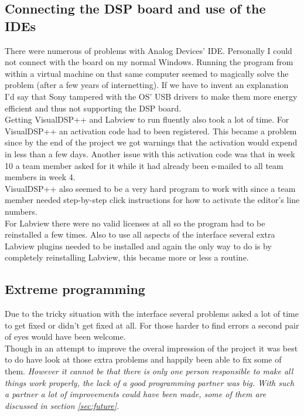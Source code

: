\subsection{Connecting the DSP board and use of the IDEs}
There were numerous of problems with Analog Devices' IDE. Personally I could not connect with the board on my normal Windows. Running the program from within a virtual machine on that same computer seemed to magically solve the problem (after a few years of internetting). If we have to invent an explanation I'd say that Sony tampered with the OS' USB drivers to make them more energy efficient and thus not supporting the DSP board.\\
Getting VisualDSP++ and Labview to run fluently also took a lot of time. For VisualDSP++ an activation code had to been registered. This became a problem since by the end of the project we got warnings that the activation would expend in less than a few days. Another issue with this activation code was that in week 10 a team member asked for it while it had already been e-mailed to all team members in week 4.\\
VisualDSP++ also seemed to be a very hard program to work with since a team member needed step-by-step click instructions for how to activate the editor's line numbers. \\
For Labview there were no valid licenses at all so the program had to be reinstalled a few times. Also to use all aspects of the interface several extra Labview plugins needed to be installed and again the only way to do is by completely reinstalling Labview, this became more or less a routine.
\subsection{Extreme programming}
Due to the tricky situation with the interface several problems asked a lot of time to get fixed or didn't get fixed at all. For those harder to find errors a second pair of eyes would have been welcome.\\
Though in an attempt to improve the overal impression of the project it was best to do have look at those extra problems and happily been able to fix some of them. \emph{However it cannot be that there is only one person responsible to make all things work properly, the lack of a good programming partner was big. With such a partner a lot of improvements could have been made, some of them are discussed in section \ref{sec:future}.}
